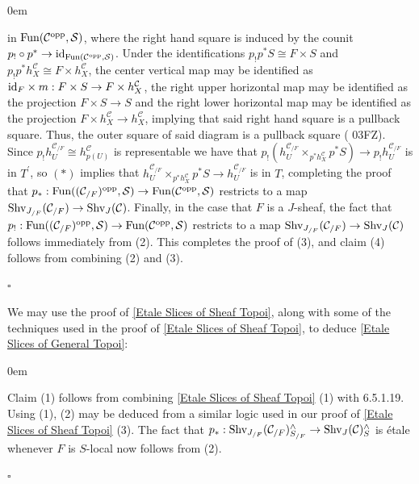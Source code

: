 \documentclass[10pt]{article}
\newcommand{\mS}{\mathcal S}
\newcommand{\C}{\mathcal C}
\renewcommand{\qed}{\hfill$\square$}
\renewenvironment{proof}{\begin{addmargin}[1em]{0em}\begin{newproof}}{\end{newproof}\end{addmargin}\qed}
\theoremstyle{witharg}
\theoremstyle{witharg}
\theoremstyle{witharg2}
\begin{document}
\begin{proof}
\noindent in $\textnormal{Fun}(\C^{\textnormal{opp}},\mS)$, where the right hand square is induced by the counit $p_!\circ p^*\rightarrow \textnormal{id}_{\textnormal{Fun}(\C^{\textnormal{opp}},\mS)}$. Under the identifications $p_! p^*S\cong F\times S$ and $p_! p^*h^\C_X\cong F\times h^\C_X$, the center vertical map may be identified as $\textnormal{id}_F\times m:F\times S\rightarrow F\times h^\C_X$, the right upper horizontal map may be identified as the projection $F\times S\rightarrow S$ and the right lower horizontal map may be identified as the projection $F\times h^\C_X\rightarrow h^\C_X$, implying that said right hand square is a pullback square. Thus, the outer square of said diagram is a pullback square ( 03FZ). Since $p_!h^{\C_{/F}}_U\cong h^\C_{p(U)}$ is representable we have that $p_!(h^{\C_{/F}}_U\times_{p^*h^\C_X}p^*S)\rightarrow p_!h^{\C_{/F}}_U$ is in $T^\prime$, so $(*)$ implies that $h^{\C_{/F}}_U\times_{p^*h^\C_X}p^*S\rightarrow h^{\C_{/F}}_U$ is in $T$, completing the proof that $p_*:\textnormal{Fun}((\C_{/F})^{\textnormal{opp}},\mS)\rightarrow \textnormal{Fun}(\C^{\textnormal{opp}},\mS)$ restricts to a map $\textnormal{Shv}_{J_{/F}}(\C_{/F})\rightarrow \textnormal{Shv}_J(\C)$. Finally, in the case that $F$ is a $J$-sheaf, the fact that $p_!:\textnormal{Fun}((\C_{/F})^{\textnormal{opp}},\mS)\rightarrow \textnormal{Fun}(\C^{\textnormal{opp}},\mS)$ restricts to a map $\textnormal{Shv}_{J_{/F}}(\C_{/F})\rightarrow \textnormal{Shv}_J(\C)$ follows immediately from (2). This completes the proof of (3), and claim (4) follows from combining (2) and (3). 


    
\end{proof}

\noindent We may use the proof of \ref{Etale Slices of Sheaf Topoi}, along with some of the techniques used in the proof of \ref{Etale Slices of Sheaf Topoi}, to deduce \ref{Etale Slices of General Topoi}:

\begin{proof}

    Claim (1) follows from combining \ref{Etale Slices of Sheaf Topoi} (1) with  6.5.1.19. Using (1), (2) may be deduced from a similar logic used in our proof of \ref{Etale Slices of Sheaf Topoi} (3). The fact that $p_*:\textnormal{Shv}_{J_{/F}}(\C_{/F})^\wedge_{S_{/F}}\rightarrow \textnormal{Shv}_{J}(\C)^\wedge_{S}$ is \'{e}tale whenever $F$ is $S$-local now follows from (2). 
    
    
\end{proof}
\end{document}
